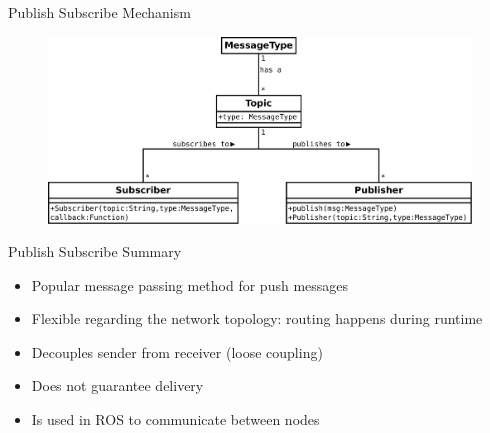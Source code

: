 \documentclass[compress]{beamer}
\begin{document}
\begin{frame}{Publish Subscribe Mechanism}
\begin{figure}[t]
    \centering
    \includegraphics[width=\textwidth]{diagrams/ros_pubsub}
\end{figure}
\end{frame}

\begin{frame}{Publish Subscribe Summary}
\begin{itemize}
\item Popular message passing method for push messages
\item Flexible regarding the network topology: routing happens during runtime
\item Decouples sender from receiver (loose coupling)
\item Does not guarantee delivery
\item Is used in ROS to communicate between nodes
\end{itemize}
\end{frame}
\end{document}
